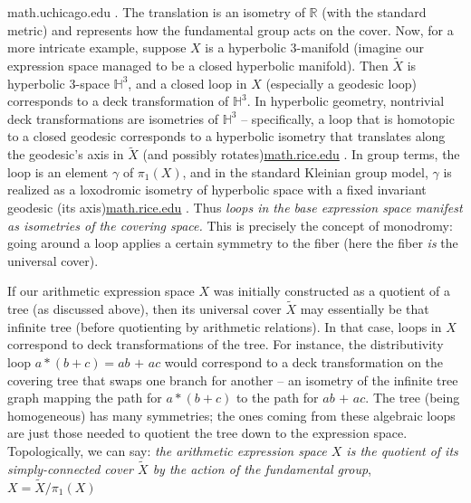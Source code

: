 \documentclass[11pt]{article}
\theoremstyle{remark}
\begin{document}
math.uchicago.edu
. The translation is an isometry of $\mathbb{R}$ (with the standard metric) and represents how the fundamental group acts on the cover. Now, for a more intricate example, suppose $X$ is a hyperbolic 3-manifold (imagine our expression space managed to be a closed hyperbolic manifold). Then $\widetilde{X}$ is hyperbolic 3-space $ \mathbb{H}^3$, and a closed loop in $X$ (especially a geodesic loop) corresponds to a deck transformation of $\mathbb{H}^3$. In hyperbolic geometry, nontrivial deck transformations are isometries of $\mathbb{H}^3$ – specifically, a loop that is homotopic to a closed geodesic corresponds to a hyperbolic isometry that translates along the geodesic’s axis in $\widetilde{X}$ (and possibly rotates)\href{https://math.rice.edu/~ar99/LLR_v4.pdf#:~:text=match%20at%20L320%20loxo%02dromic%20element,and%20commutes%20with%20a}{math.rice.edu}
. In group terms, the loop is an element $\gamma$ of $\pi_1(X)$, and in the standard Kleinian group model, $\gamma$ is realized as a loxodromic isometry of hyperbolic space with a fixed invariant geodesic (its axis)\href{https://math.rice.edu/~ar99/LLR_v4.pdf#:~:text=match%20at%20L320%20loxo%02dromic%20element,and%20commutes%20with%20a}{math.rice.edu}
. Thus \textit{loops in the base expression space manifest as isometries of the covering space.} This is precisely the concept of monodromy: going around a loop applies a certain symmetry to the fiber (here the fiber \textit{is} the universal cover).

If our arithmetic expression space $X$ was initially constructed as a quotient of a tree (as discussed above), then its universal cover $\widetilde{X}$ may essentially be that infinite tree (before quotienting by arithmetic relations). In that case, loops in $X$ correspond to deck transformations of the tree. For instance, the distributivity loop $a*(b+c) = a\textit{b + a}c$ would correspond to a deck transformation on the covering tree that swaps one branch for another – an isometry of the infinite tree graph mapping the path for $a*(b+c)$ to the path for $a\textit{b + a}c$. The tree (being homogeneous) has many symmetries; the ones coming from these algebraic loops are just those needed to quotient the tree down to the expression space. Topologically, we can say: \textit{the arithmetic expression space $X$ is the quotient of its simply-connected cover $\widetilde{X}$ by the action of the fundamental group}, $X = \widetilde{X} / \pi_1(X)$
\end{document}
